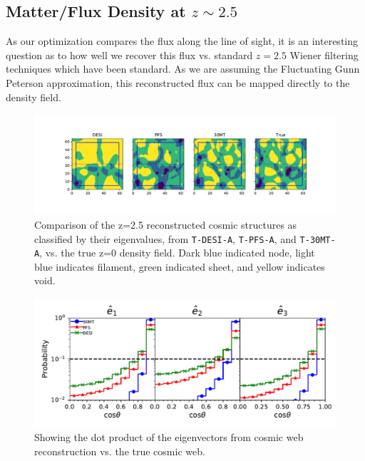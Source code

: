 \documentclass[usenatbib,onecolumn]{mnras}
\begin{document}

\subsection{Matter/Flux Density at $z\sim 2.5$}

As our optimization compares the flux along the line of sight, it is an interesting question as to how well we recover this flux vs. standard $z=2.5$ Wiener filtering techniques which have been standard. As we are assuming the Fluctuating Gunn Peterson approximation, this reconstructed flux can be mapped directly to the density field.


\begin{figure}
  \centering 
  
  \includegraphics[trim=1cm 2cm 0cm 0cm,width=1.0\textwidth]{./figs_treepm/cosmic_structure_z=2.pdf}
    \caption{Comparison of the z=2.5 reconstructed cosmic structures as classified by their eigenvalues, from \texttt{T-DESI-A}, \texttt{T-PFS-A}, and \texttt{T-30MT-A}, vs. the true z=0 density field. Dark blue indicated node, light blue indicates filament, green indicated sheet, and yellow indicates void.} 
    \label{fig_config}
\end{figure}

\begin{figure}
  \centering 
  
  \includegraphics[trim=1cm 0cm 0cm 0cm,width=1.0\textwidth]{./figs_treepm/eigenvectors_z=2.pdf}
    \caption{Showing the dot product of the eigenvectors from cosmic web reconstruction vs. the true cosmic web.} 
    \label{fig_cosmicweb}
\end{figure}
\end{document}
